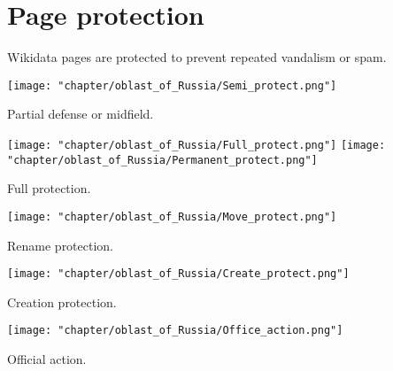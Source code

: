 
\chapter{Page protection}

Wikidata pages are protected to prevent repeated vandalism or spam.

\begin{marginfigure}[1.0cm]
{
	\setlength{\fboxsep}{0pt}%
	\setlength{\fboxrule}{1pt}%
	{\texttt{[image: "chapter/oblast\_of\_Russia/Semi\_protect.png"]}}
}
\caption [Icon. Partial defense or midfield.]{Partial defense or midfield.}%
\label{fig:legend_population}%
\end{marginfigure}

\begin{marginfigure}[3.5cm]
{
	\setlength{\fboxsep}{0pt}%
	\setlength{\fboxrule}{1pt}%
	{\texttt{[image: "chapter/oblast\_of\_Russia/Full\_protect.png"]}}
	{\texttt{[image: "chapter/oblast\_of\_Russia/Permanent\_protect.png"]}}
}
\caption [Icon. Full protection.]{Full protection.}%
\label{fig:legend_population}%
\end{marginfigure}

\begin{marginfigure}[6.0cm]
{
	\setlength{\fboxsep}{0pt}%
	\setlength{\fboxrule}{1pt}%
	{\texttt{[image: "chapter/oblast\_of\_Russia/Move\_protect.png"]}}
}
\caption [Icon. Protection against renaming.]{Rename protection.}%
\label{fig:legend_population}%
\end{marginfigure}

\begin{marginfigure}[8.5cm]
{
	\setlength{\fboxsep}{0pt}%
	\setlength{\fboxrule}{1pt}%
	{\texttt{[image: "chapter/oblast\_of\_Russia/Create\_protect.png"]}}
}
\caption [Icon. Protection from creation.]{Creation protection.}%
\label{fig:legend_population}%
\end{marginfigure}

\begin{marginfigure}[11.0cm]
{
	\setlength{\fboxsep}{0pt}%
	\setlength{\fboxrule}{1pt}%
	{\texttt{[image: "chapter/oblast\_of\_Russia/Office\_action.png"]}}
}
\caption [Icon. Official action.]{Official action.}%
\label{fig:legend_population}%
\end{marginfigure}

